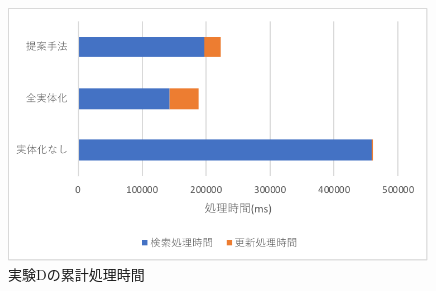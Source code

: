 \documentclass[a4paper,11pt]{ujreport}
\begin{document}
\begin{figure}[htbp]
	\begin{center}
		\includegraphics[width=30em]{src/ExperimentD-total.pdf} %
	\end{center}
	\caption{実験Dの累計処理時間}
	\label{figure:ExperimentD-total}
\end{figure}
\end{document}
